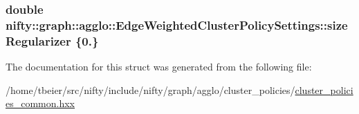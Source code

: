 \subsubsection[{size\+Regularizer}]{\setlength{\rightskip}{0pt plus 5cm}double nifty\+::graph\+::agglo\+::\+Edge\+Weighted\+Cluster\+Policy\+Settings\+::size\+Regularizer \{0.\}}\label{structnifty_1_1graph_1_1agglo_1_1EdgeWeightedClusterPolicySettings_a16830167af377ff60fd7831c4ca30074}


The documentation for this struct was generated from the following file\+:\begin{DoxyCompactItemize}
\item 
/home/tbeier/src/nifty/include/nifty/graph/agglo/cluster\+\_\+policies/\hyperlink{cluster__policies__common_8hxx}{cluster\+\_\+policies\+\_\+common.\+hxx}\end{DoxyCompactItemize}
